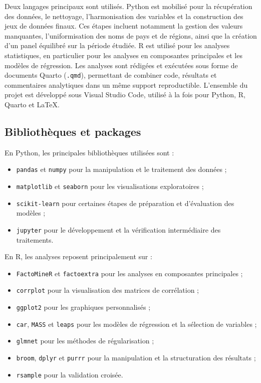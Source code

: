 \documentclass{article}
\begin{document}
Deux langages principaux sont utilisés. Python est mobilisé pour la récupération des données, le nettoyage, l’harmonisation des variables et la construction des jeux de données finaux.
Ces étapes incluent notamment la gestion des valeurs manquantes, l’uniformisation des noms de pays et de régions, ainsi que la création d’un panel équilibré sur la période étudiée.
R est utilisé pour les analyses statistiques, en particulier pour les analyses en composantes principales et les modèles de régression. Les analyses sont rédigées et exécutées sous forme de documents Quarto (\texttt{.qmd}), permettant de combiner code, résultats et commentaires analytiques dans un même support reproductible.
L’ensemble du projet est développé sous Visual Studio Code, utilisé à la fois pour Python, R, Quarto et \LaTeX{}.

\subsection{Bibliothèques et packages}

En Python, les principales bibliothèques utilisées sont :
\begin{itemize}
  \item \texttt{pandas} et \texttt{numpy} pour la manipulation et le traitement des données ;
  \item \texttt{matplotlib} et \texttt{seaborn} pour les visualisations exploratoires ;
  \item \texttt{scikit-learn} pour certaines étapes de préparation et d’évaluation des modèles ;
  \item \texttt{jupyter} pour le développement et la vérification intermédiaire des traitements.
\end{itemize}

En R, les analyses reposent principalement sur :
\begin{itemize}
  \item \texttt{FactoMineR} et \texttt{factoextra} pour les analyses en composantes principales ;
  \item \texttt{corrplot} pour la visualisation des matrices de corrélation ;
  \item \texttt{ggplot2} pour les graphiques personnalisés ;
  \item \texttt{car}, \texttt{MASS} et \texttt{leaps} pour les modèles de régression et la sélection de variables ;
  \item \texttt{glmnet} pour les méthodes de régularisation ;
  \item \texttt{broom}, \texttt{dplyr} et \texttt{purrr} pour la manipulation et la structuration des résultats ;
  \item \texttt{rsample} pour la validation croisée.
\end{itemize}
\end{document}
